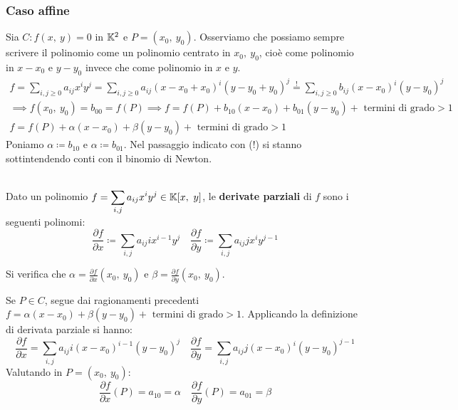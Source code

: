 \subsubsection{Caso affine}
Sia $C\colon f\left(x,\ y\right)=0$ in $\mathbb{K}^2$ e $P=(x_0,\ y_0)$. Osserviamo che possiamo sempre scrivere il polinomio come un polinomio centrato in $x_0,\ y_0$, cioè come polinomio in $x-x_0$ e $y-y_0$ invece che come polinomio in $x$ e $y$.
\begin{gather*}
		f=\sum_{i,j\geq 0} a_{ij}x^iy^j = \sum_{i,j\geq 0} a_{ij}(x-x_0+x_0)^i(y-y_0+y_0)^j \stackrel{!}{=} 	\sum_{i,j\geq 0}b_{ij}(x-x_0)^i(y-y_0)^j\\
		\implies f(x_0,\ y_0)=b_{00}=f\left(P\right) \implies f=f\left(P\right) +b_{10} (x-x_0)+b_{01} (y-y_0)+ \text{ termini di grado} >1\\
		f=f\left(P\right) +\alpha (x-x_0)+\beta (y-y_0)+ \text{ termini di grado} >1
\end{gather*}
Poniamo $\alpha\coloneqq b_{10}$ e $\alpha\coloneqq b_{01}$. Nel passaggio indicato con (!) si stanno sottintendendo conti con il binomio di Newton.\\
\begin{define}~{}\\
	Dato un polinomio $\displaystyle f=\sum_{i,j}a_{ij}x^iy^j\in\mathbb{K}[x,\ y]$, le \textbf{derivate parziali} di $f$ sono i seguenti polinomi:
	\begin{equation}
		\frac{\partial{f}}{\partial{x}}\coloneqq \sum_{i,j}a_{ij}ix^{i-1}y^j\quad \frac{\partial{f}}{\partial{y}}\coloneqq \sum_{i,j}a_{ij}jx^iy^{j-1}
	\end{equation}
\vspace{-3mm}
\end{define}
Si verifica che $\alpha=\frac{\partial{f}}{\partial{x}}(x_0,\ y_0)$ e $\beta=\frac{\partial{f}}{\partial{y}}(x_0,\ y_0)$.
\begin{demonstration}
	Se $P\in C$, segue dai ragionamenti precedenti $f=\alpha (x-x_0)+\beta (y-y_0)+ \text{ termini di grado} >1$. Applicando la definizione di derivata parziale si hanno:
	\begin{equation*}
		\frac{\partial{f}}{\partial{x}}= \sum_{i,j}a_{ij}i\left(x-x_0\right)^{i-1}\left(y-y_0\right)^j\quad \frac{\partial{f}}{\partial{y}}= \sum_{i,j}a_{ij}j\left(x-x_0\right)^i\left(y-y_0\right)^{j-1}
	\end{equation*}
	Valutando in $P=(x_0,\ y_0)$:
	\begin{equation*}
		\frac{\partial{f}}{\partial{x}}\left(P\right)=a_{10}=\alpha\quad \frac{\partial{f}}{\partial{y}}\left(P\right)=a_{01}=\beta
	\end{equation*}
\end{demonstration}

